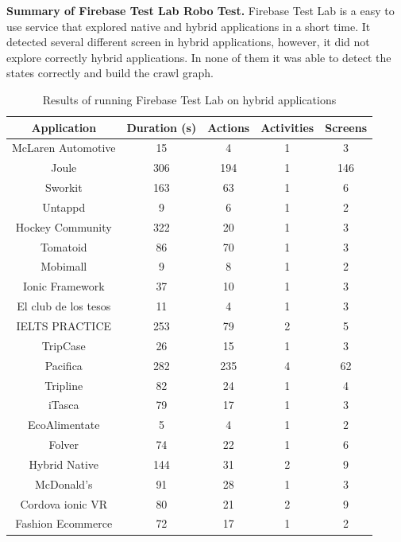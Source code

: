 \textbf{Summary of Firebase Test Lab Robo Test.} Firebase Test Lab is a easy to use service that explored native and hybrid applications in a short time. It detected several different screen in hybrid applications, however, it did not explore correctly hybrid applications. In none of them it was able to detect the states correctly and build the crawl graph.

\begin{table}[t]
\centering
\caption{Results of running Firebase Test Lab on hybrid applications}
\label{FirebaseHybrid}
\begin{adjustbox}{width=0.9\textwidth}
	\begin{tabular}{|c|c|c|c|c|}
		\hline
		\textbf{Application} & \textbf{Duration (s)} & \textbf{Actions} & \textbf{Activities} & \textbf{Screens} \\\hline
		McLaren Automotive & 15 & 4 & 1 & 3 \\\hline
		Joule & 306 & 194 & 1 & 146 \\\hline
		Sworkit & 163 & 63 & 1 & 6 \\\hline
		Untappd & 9 & 6 & 1 & 2 \\\hline
		Hockey Community & 322 & 20 & 1 & 3 \\\hline
		Tomatoid & 86 & 70 & 1 & 3 \\\hline
		Mobimall & 9 & 8 & 1 & 2 \\\hline
		Ionic Framework & 37 & 10 & 1 & 3 \\\hline
		El club de los tesos & 11 & 4 & 1 & 3 \\\hline
		IELTS PRACTICE & 253 & 79 & 2 & 5 \\\hline
		TripCase & 26 & 15 & 1 & 3 \\\hline
		Pacifica & 282 & 235 & 4 & 62 \\\hline
		Tripline & 82 & 24 & 1 & 4 \\\hline
		iTasca & 79 & 17 & 1 & 3 \\\hline
		EcoAlimentate & 5 & 4 & 1 & 2 \\\hline
		Folver & 74 & 22 & 1 & 6 \\\hline
		Hybrid Native & 144 & 31 & 2 & 9 \\\hline
		McDonald's & 91 & 28 & 1 & 3 \\\hline
		Cordova ionic VR & 80 & 21 & 2 & 9 \\\hline
		Fashion Ecommerce & 72 & 17 & 1 & 2 \\\hline
	\end{tabular}
\end{adjustbox}
\end{table}
